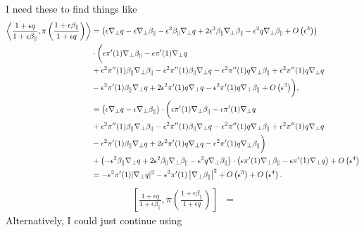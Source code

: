 \documentclass{article}
\newcommand{\para}{\parallel}
\newcommand{\ep}{\epsilon}
\newcommand{\np}{\nabla_\perp}
\newcommand{\fr}{\frac{1+\ep q}{1+\ep\beta_\para}}
\newcommand{\frinv}{\frac{1+\ep\beta_\para}{1+\ep q}}
\newcommand{\pth} [1] {\left( #1 \right) }
\newcommand{\br} [1] {\left[ #1 \right] }
\begin{document}
I need these to find things like 
\begin{align*}
    \Braket{\fr,\pi\pth{\frinv}} &= \pth{\ep\np q - \ep\np\beta_\para - \ep^2\beta_\para\np q + 2\ep^2\beta_\para\np\beta_\para - \ep^2q\np\beta_\para + O\pth{\ep^3}} \\ 
    &\cdot\biggl( \ep\pi'(1) \np\beta_\para - \ep\pi'(1) \np q \biggr. \\ 
    &+ \ep^2\pi''(1) \beta_\para\np \beta_\para - \ep^2\pi''(1) \beta_\para\np q - \ep^2\pi''(1) q\np\beta_\para + \ep^2\pi''(1) q\np q \\ 
    &- \biggl. \ep^2\pi'(1) \beta_\para\np q + 2\ep^2\pi'(1) q\np q - \ep^2\pi'(1) q\np\beta_\para + O\pth{\ep^3} \biggr), \\ 
        &= \pth{\ep\np q - \ep\np\beta_\para} \cdot \biggl( \ep\pi'(1) \np\beta_\para - \ep\pi'(1) \np q \biggr. \\ 
        &+ \ep^2\pi''(1) \beta_\para\np \beta_\para - \ep^2\pi''(1) \beta_\para\np q - \ep^2\pi''(1) q\np\beta_\para + \ep^2\pi''(1) q\np q \\ 
        &- \biggl. \ep^2\pi'(1) \beta_\para\np q + 2\ep^2\pi'(1) q\np q - \ep^2\pi'(1) q\np\beta_\para \biggr) \\ 
        &+ \pth{-\ep^2\beta_\para\np q + 2\ep^2\beta_\para\np\beta_\para - \ep^2q\np\beta_\para} \cdot \pth{\ep\pi'(1) \np\beta_\para - \ep\pi'(1) \np q} + O\pth{\ep^4} \\ 
        &= -\ep^2\pi'(1)|\np q|^2 - \ep^2\pi'(1) \left|\np\beta_\para\right|^2 + O\pth{\ep^3} + O\pth{\ep^4}. 
\end{align*}
\begin{align*}
    \br{\fr, \pi\pth{\frinv}} &= 
\end{align*}
Alternatively, I could just continue using 
\end{document}
